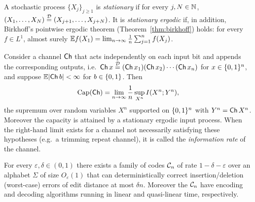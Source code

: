 \begin{definition}
  \label{def:stationary-ergodic}
  A stochastic process $\{X_j\}_{j\ge1}$ is \emph{stationary} if for every
  $j,N\in\mathbb{N}$, $(X_1,\dots,X_N) \overset{\mathcal{D}}{=} (X_{j+1},\dots,X_{j+N})$. It
  is \emph{stationary ergodic} if, in addition, Birkhoff's pointwise ergodic
  theorem (Theorem~\ref{thm:birkhoff}) holds: for every $f\in L^1$, almost surely
  $\mathbb{E} f(X_1) = \lim_{n\to\infty}\tfrac1n\sum_{j=1}^n f(X_j)$.
\end{definition}


\begin{theorem}
  \label{thm:gen-shannon}
  \notready
  Consider a channel $\mathsf{Ch}$ that acts independently on each input bit and appends
  the corresponding outputs, i.e.\ $\mathsf{Ch}\,x \overset{\mathcal{D}}{=}
  (\mathsf{Ch}\,x_1)(\mathsf{Ch}\,x_2)\cdots(\mathsf{Ch}\,x_n)$ for $x\in\{0,1\}^n$, and suppose
  $\mathbb{E}|\mathsf{Ch}\,b|<\infty$ for $b\in\{0,1\}$. Then
  \[
    \mathrm{Cap}(\mathsf{Ch}) = \lim_{n\to\infty}\frac1n \sup_{X^n} I(X^n;Y^n),
  \]
  the supremum over random variables $X^n$ supported on $\{0,1\}^n$ with
  $Y^n=\mathsf{Ch}\,X^n$. Moreover the capacity is attained by a stationary ergodic input
  process. When the right-hand limit exists for a channel not necessarily
  satisfying these hypotheses (e.g.\ a trimming repeat channel), it is called the
  \emph{information rate} of the channel.
\end{theorem}

\begin{theorem}
  \label{thm:outer-code}
  \notready
  For every $\varepsilon,\delta\in(0,1)$ there exists a family of codes $\mathcal{C}_n$
  of rate $1-\delta-\varepsilon$ over an alphabet $\Sigma$ of size $O_\varepsilon(1)$
  that can deterministically correct insertion/deletion (worst-case) errors of
  edit distance at most $\delta n$. Moreover the $\mathcal{C}_n$ have encoding and
  decoding algorithms running in linear and quasi-linear time, respectively.
\end{theorem}


